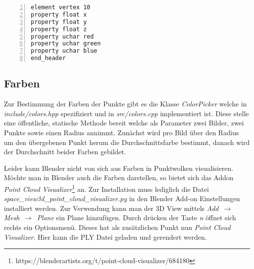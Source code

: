 \begin{lstlisting}[numbers=left, breaklines=true, breakatwhitespace=false, label=lst:ply_vertex_element, caption=Beispiel PLY Header für 10 Vertex Elemente mit den Attributen Position und Farbe]
element vertex 10
property float x
property float y
property float z
property uchar red
property uchar green
property uchar blue
end_header
\end{lstlisting}

\subsection{Farben}
Zur Bestimmung der Farben der Punkte gibt es die Klasse \emph{ColorPicker} welche in \emph{include/colors.hpp} spezifiziert und in \emph{src/colors.cpp} implementiert ist.
Diese stelle eine öffentliche, statische Methode bereit welche als Parameter zwei Bilder, zwei Punkte sowie einen Radius annimmt.
Zunächst wird pro Bild über den Radius um den übergebenen Punkt herum die Durchschnittsfarbe bestimmt, danach wird der Durchschnitt beider Farben gebildet.

Leider kann Blender nicht von sich aus Farben in Punktwolken visualisieren.
Möchte man in Blender auch die Farben darstellen, so bietet sich das Addon \emph{Point Cloud Visualizer}\footnote{https://blenderartists.org/t/point-cloud-visualizer/684180} an.
Zur Installation muss lediglich die Datei \emph{space\_view3d\_point\_cloud\_visualizer.py} in den Blender Add-on Einstellungen installiert werden.
Zur Verwendung kann man der 3D View mittels \emph{Add}  $\,\to\,$ \emph{Mesh} $\,\to\,$ \emph{Plane} ein Plane hinzufügen.
Durch drücken der Taste \emph{n} öffnet sich rechts ein Optionsmenü.
Dieses hat als zusätzlichen Punkt nun \emph{Point Cloud Visualizer}.
Hier kann die PLY Datei geladen und gerendert werden.\cite{}